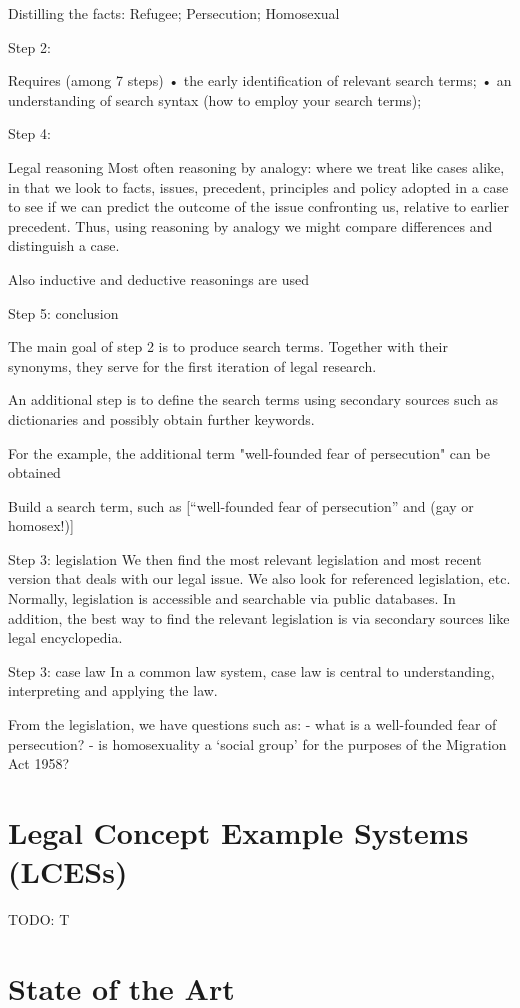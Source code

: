 \documentclass{IOS-Book-Article}
\begin{document}
Distilling the facts: Refugee; Persecution; Homosexual

Step 2:

Requires (among 7 steps)
• the early identification of relevant search terms;
• an understanding of search syntax (how to employ your search terms);

Step 4:

Legal reasoning
Most often reasoning by analogy: where we treat like cases alike, in that we look to facts, issues, precedent, principles and policy adopted in a case to see if we can predict the outcome of the issue confronting us, relative to earlier precedent. Thus, using reasoning by analogy we might compare differences and distinguish a case.

Also inductive and deductive reasonings are used

Step 5: conclusion

The main goal of step 2 is to produce search terms. Together with their synonyms, they serve for the first iteration of legal research.

An additional step is to define the search terms using secondary sources such as dictionaries and possibly obtain further keywords.

For the example, the additional term "well-founded fear of persecution" can be obtained

Build a search term, such as [“well-founded fear of persecution” and (gay or homosex!)]

Step 3: legislation
We then find the most relevant legislation and most recent version that deals with our legal issue. We also look for referenced legislation, etc. Normally, legislation is accessible and searchable via public databases. In addition, the best way to find the relevant legislation is via secondary sources like legal encyclopedia.

Step 3: case law
In a common law system, case law is central to
understanding, interpreting and applying the law.

From the legislation, we have questions such as:
- what is a well-founded fear of persecution?
- is homosexuality a ‘social group’ for the purposes of the Migration Act 1958?

\section{Legal Concept Example Systems (LCESs)}

TODO: T

\section{State of the Art}
\end{document}
